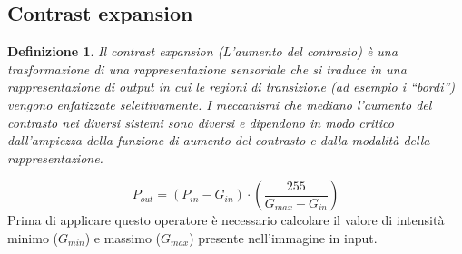 \documentclass{report}
\newtheorem{defi}{Definizione}[section]
\begin{document}
\subsection{Contrast expansion}
\label{sec:cont-exp}
\begin{defi}
  Il contrast expansion (L'aumento del contrasto) è una trasformazione
  di una rappresentazione sensoriale che si traduce in una
  rappresentazione di output in cui le regioni di transizione
  (ad esempio i ``bordi'') vengono enfatizzate selettivamente.
  I meccanismi che mediano l'aumento del contrasto nei diversi sistemi
  sono diversi e dipendono in modo critico dall'ampiezza della funzione
  di aumento del contrasto e dalla modalità della rappresentazione.
\end{defi}
\begin{equation}
  \label{eq:cont-exp}
  P_{out} = (P_{in} -G_{in})\cdot \left(\frac{255}{G_{max} - G_{in}}\right)
\end{equation}
Prima di applicare questo operatore è necessario calcolare il valore di intensità minimo ($G_{min}$) e massimo ($G_{max}$) presente nell'immagine in input.
\end{document}
